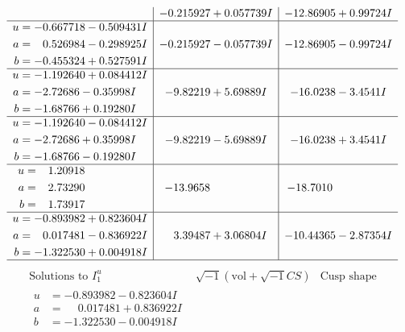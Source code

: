 \documentclass[1p]{elsarticle_modified}
\theoremstyle{definition}
\newcommand{\I}{\sqrt{-1}}
\begin{document}
$$\begin{array}{c|c|c}
 & -0.215927 + 0.057739 I & -12.86905 + 0.99724 I \\ \hline\begin{aligned}
u &= -0.667718 - 0.509431 I \\
a &= \phantom{-}0.526984 - 0.298925 I \\
b &= -0.455324 + 0.527591 I\end{aligned}
 & -0.215927 - 0.057739 I & -12.86905 - 0.99724 I \\ \hline\begin{aligned}
u &= -1.192640 + 0.084412 I \\
a &= -2.72686 - 0.35998 I \\
b &= -1.68766 + 0.19280 I\end{aligned}
 & -9.82219 + 5.69889 I & -16.0238 - 3.4541 I \\ \hline\begin{aligned}
u &= -1.192640 - 0.084412 I \\
a &= -2.72686 + 0.35998 I \\
b &= -1.68766 - 0.19280 I\end{aligned}
 & -9.82219 - 5.69889 I & -16.0238 + 3.4541 I \\ \hline\begin{aligned}
u &= \phantom{-}1.20918\phantom{ +0.000000I} \\
a &= \phantom{-}2.73290\phantom{ +0.000000I} \\
b &= \phantom{-}1.73917\phantom{ +0.000000I}\end{aligned}
 & -13.9658\phantom{ +0.000000I} & -18.7010\phantom{ +0.000000I} \\ \hline\begin{aligned}
u &= -0.893982 + 0.823604 I \\
a &= \phantom{-}0.017481 - 0.836922 I \\
b &= -1.322530 + 0.004918 I\end{aligned}
 & \phantom{-}3.39487 + 3.06804 I & -10.44365 - 2.87354 I\\
 \hline 
 \end{array}$$\newpage$$\begin{array}{c|c|c}  
\text{Solutions to }I^u_{1}& \I (\text{vol} + \sqrt{-1}CS) & \text{Cusp shape}\\
 \hline 
\begin{aligned}
u &= -0.893982 - 0.823604 I \\
a &= \phantom{-}0.017481 + 0.836922 I \\
b &= -1.322530 - 0.004918 I\end{aligned}

\end{array}$$
\end{document}
